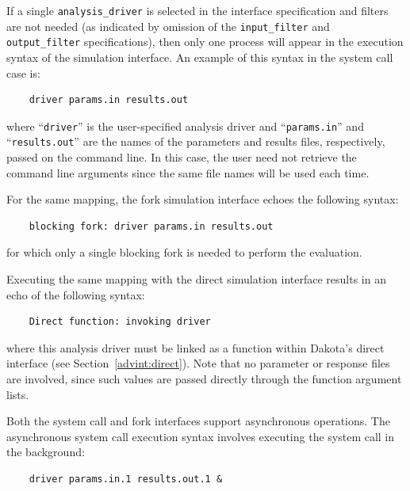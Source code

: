 If a single \texttt{analysis\_driver} is selected in the interface
specification and filters are not needed (as indicated by omission of
the \texttt{input\_filter} and \texttt{output\_filter}
specifications), then only one process will appear in the execution
syntax of the simulation interface. An example of this syntax in the
system call case is:
\begin{small}
\begin{verbatim}
    driver params.in results.out
\end{verbatim}
\end{small}

where ``\texttt{driver}'' is the user-specified analysis driver and
``\texttt{params.in}'' and ``\texttt{results.out}'' are the names of the
parameters and results files, respectively, passed on the command
line. In this case, the user need not retrieve the command line
arguments since the same file names will be used each time.

For the same mapping, the fork simulation interface echoes the
following syntax:
\begin{small}
\begin{verbatim}
    blocking fork: driver params.in results.out
\end{verbatim}
\end{small}

for which only a single blocking fork is needed to perform the
evaluation.

Executing the same mapping with the direct simulation interface
results in an echo of the following syntax:
\begin{small}
\begin{verbatim}
    Direct function: invoking driver
\end{verbatim}
\end{small}

where this analysis driver must be linked as a function within
Dakota's direct interface (see Section~\ref{advint:direct}). Note that
no parameter or response files are involved, since such values
are passed directly through the function argument lists.

Both the system call and fork interfaces support asynchronous
operations. The asynchronous system call execution syntax involves
executing the system call in the background:
\begin{small}
\begin{verbatim}
    driver params.in.1 results.out.1 &
\end{verbatim}
\end{small}

